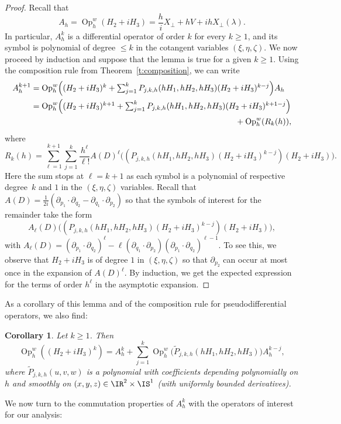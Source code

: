 \documentclass[JEP,XML,SOM,Unicode, NoEqCountersInSection,published]{cedram}
\theoremstyle{plain}
\newtheorem{coro}[theo]{Corollary}
\theoremstyle{definition}
\theoremstyle{remark}
\newcommand{\Op}{\operatorname{Op}}
\begin{document}
\begin{proof}
Recall that
\[
A_h=\Op_h^w(H_2+iH_3)=\frac{h}{i}X_\perp+hV+ihX_\perp(\lambda).
\]
In particular, $A_h^k$ is a differential operator of order $k$ for every $k\geq 1$, and its symbol is polynomial of degree $\leq k$ in the cotangent variables $(\xi,\eta,\zeta)$. We now proceed by induction and suppose that the lemma is true for a given $k\geq 1$. Using the composition rule from Theorem~\ref{t:composition}, we can write
\begin{align*}
A_h^{k+1} & =\textstyle\Op_h^w\Bigl((H_2+iH_3)^k+\sum_{j=1}^{k}P_{j,k,h}(hH_1,hH_2,hH_3)(H_2+iH_3)^{k-j}\Bigr)A_h\\
& = \textstyle\Op_h^w\Bigl((H_2+iH_3)^{k+1}+\sum_{j=1}^{k}P_{j,k,h}(hH_1,hH_2,hH_3)(H_2+iH_3)^{k+1-j}\Bigr) \\
& \hspace*{8.8cm} +\Op_h^w(R_k(h)),
\end{align*}
where
\[
R_k(h)=
\sum_{\ell=1}^{k+1}\sum_{j=1}^{k}\frac{h^{\ell}}{\ell!}A(D)^\ell\bigl((P_{j,k,h}(hH_1,hH_2,hH_3)(H_2+iH_3)^{k-j})(H_2+iH_3)\bigr).
\]
Here the sum stops at $\ell=k+1$ as each symbol is a polynomial of respective degree~$k$ and $1$ in the $(\xi,\eta,\zeta)$ variables. Recall that $A(D)=\frac{1}{2i}\left(\partial_{p_1}\cdot\partial_{q_2}-\partial_{q_1}\cdot\partial_{p_2}\right)$ so that the symbols of interest for the remainder take the form
\[
A_\ell(D)\bigl((P_{j,k,h}(hH_1,hH_2,hH_3)(H_2+iH_3)^{k-j})(H_2+iH_3)\bigr),
\]
with $A_\ell(D) = (\partial_{p_1}\cdot\partial_{q_2})^\ell-\ell(\partial_{q_1}\cdot\partial_{p_2})(\partial_{p_1}\cdot\partial_{q_2})^{\ell-1}$. To see this, we observe that $H_2+iH_3$ is of degree $1$ in $(\xi,\eta,\zeta)$ so that $\partial_{p_2}$ can occur at most once in the expansion of $A(D)^\ell$. By induction, we get the expected expression for the terms of order $h^{\ell}$ in the asymptotic expansion.
\end{proof}

As a corollary of this lemma and of the composition rule for pseudodifferential operators, we also find:
\begin{coro}\label{c:A:power-k} Let $k\geq 1$. Then
\[
\Op_h^w((H_2+iH_3)^k)=A_h^k+\sum_{j=1}^{k}\Op_h^w\bigl(\tilde{P}_{j,k,h}(hH_1,hH_2,hH_3)\bigr)A_h^{k-j},
\]
where $\tilde{P}_{j,k,h}(u,v,w)$ is a polynomial with coefficients depending polynomially on $h$ and smoothly on $(x,y,z)\in\IR^2\times\IS^1$ (with uniformly bounded derivatives).
\end{coro}

We now turn to the commutation properties of $A_h^k$ with the operators of interest for our analysis:
\end{document}
